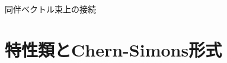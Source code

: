 \documentclass[TQFT_main]{subfiles}
\begin{document}

\begin{mytheo}[label=thm:connection-assoc]{同伴ベクトル束上の接続}
    
\end{mytheo}


\section{特性類とChern-Simons形式}
\end{document}

